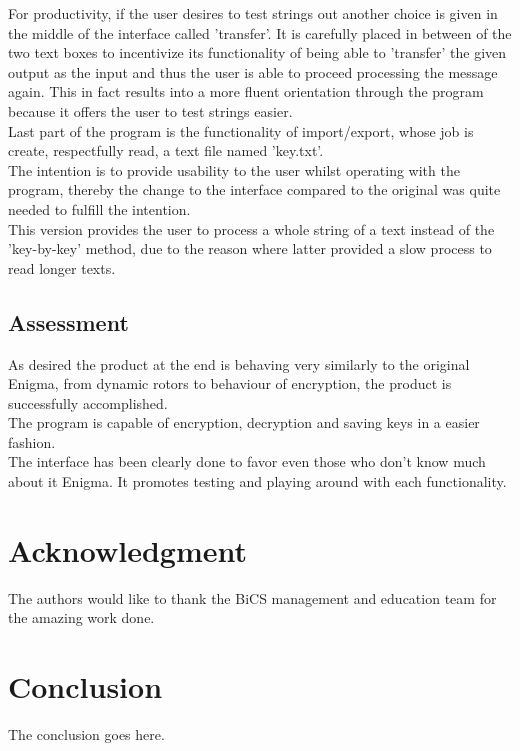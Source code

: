 \documentclass[conference,compsoc]{IEEEtran}
\begin{document}
For productivity, if the user desires to test strings out another choice is given in the middle of the interface called 'transfer'. It is carefully placed in between of the two text boxes to incentivize its functionality of being able to 'transfer' the given output as the input and thus the user is able to proceed processing the message again. This in fact results into a more fluent orientation through the program because it offers the user to test strings easier.  \\


Last part of the program is the functionality of import/export, whose job is create, respectfully read, a text file named 'key.txt'.\\

The intention is to provide usability to the user whilst operating with the program, thereby the change to the interface compared to the original was quite needed to fulfill the intention.\\
This version provides the user to process a whole string of a text instead of the 'key-by-key' method, due to the reason where latter provided a slow process to read longer texts.\\

\subsection{Assessment}
As desired the product at the end is behaving very similarly to the original Enigma, from dynamic rotors to behaviour of encryption, the product is successfully accomplished.\\
The program is capable of encryption, decryption and saving keys in a easier fashion.\\
The interface has been clearly done to favor even those who don't know much about it Enigma. It promotes testing and playing around with each functionality.\\


\section*{Acknowledgment}
The authors would like to thank the BiCS management and education team for the amazing work done.


\section{Conclusion}
The conclusion goes here.
\end{document}

